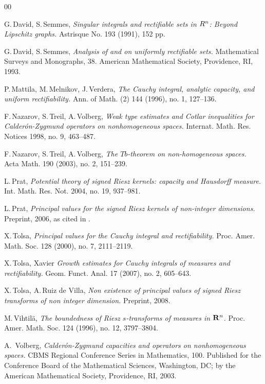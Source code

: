 \documentclass{elsart3-1}
\begin{document}
\begin{thebibliography}{00}




 G.\,David, S.\,Semmes, {\it
Singular integrals and rectifiable sets in $R\sp n$: Beyond Lipschitz graphs.}  
Astrisque No. 193 (1991), 152 pp.

 G.\,David, S.\,Semmes, {\it Analysis of and on uniformly rectifiable sets.} Mathematical Surveys and Monographs, 38. American Mathematical Society, Providence, RI, 1993.

 P.\,Mattila, M.\,Melnikov, J.\,Verdera, {\it The Cauchy integral, analytic capacity, and uniform rectifiability.} Ann. of Math. (2) 144 (1996), no. 1, 127--136.

 F.\,Nazarov, S.\,Treil, A.\,Volberg,
{\it Weak type estimates and Cotlar inequalities for Calder\'on-Zygmund operators on nonhomogeneous spaces. }
Internat. Math. Res. Notices 1998, no. 9, 463--487. 

 F.\,Nazarov, S.\,Treil, A.\,Volberg, {\it The $Tb$-theorem on non-homogeneous spaces.} Acta Math. 190 (2003), no. 2, 151--239. 

 L.\,Prat, {\it 
Potential theory of signed Riesz kernels: capacity and Hausdorff measure.}
Int. Math. Res. Not. 2004, no. 19, 937--981. 

 L.\,Prat, {\it Principal values for the signed Riesz kernels of non-integer dimensions.} Preprint, 2006, as cited in \cite{RdVTolsa}.

 X.\,Tolsa, {\it Principal values for the Cauchy integral and rectifiability.} Proc. Amer. Math. Soc. 128 (2000), no. 7, 2111--2119. 

 X.\,Tolsa, Xavier {\it
Growth estimates for Cauchy integrals of measures and rectifiability.} 
Geom. Funct. Anal. 17 (2007), no. 2, 605--643. 

 X.\,Tolsa, A.\,Ruiz de Villa, {\it Non existence of principal values of signed Riesz transforms of non integer dimension.} Preprint, 2008. 

 M.\,Vihtil\"a, {\it
The boundedness of Riesz $s$-transforms of measures in $\mathbf R\sp n$.}  
Proc. Amer. Math. Soc. 124 (1996), no. 12, 3797--3804. 

 A.\, Volberg, {\it
Calder\'on-Zygmund capacities and operators on nonhomogeneous spaces. }
CBMS Regional Conference Series in Mathematics, 100. Published for the Conference Board of the Mathematical Sciences, Washington, DC; by the American Mathematical Society, Providence, RI, 2003.

\end{thebibliography}

\bigskip
\end{document}
